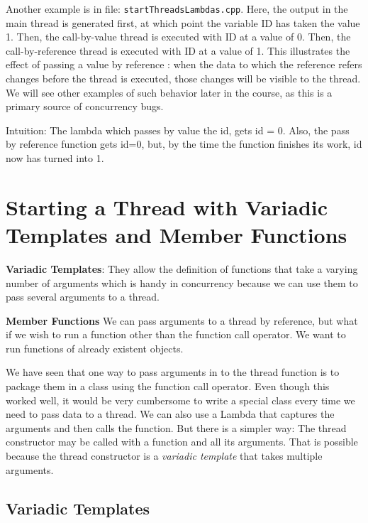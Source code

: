\documentclass[11pt, a4paper]{article}
\begin{document}
Another example is in file: \texttt{startThreadsLambdas.cpp}. Here, the output in the main thread is generated first, at which point the variable ID has taken the value 1. Then, the call-by-value thread is executed with ID at a value of 0. Then, the call-by-reference thread is executed with ID at a value of 1. This illustrates the effect of passing a value by reference : when the data to which the reference refers changes before the thread is executed, those changes will be visible to the thread. We will see other examples of such behavior later in the course, as this is a primary source of concurrency bugs.


Intuition: The lambda which passes by value the id, gets id = 0. Also, the pass by reference function gets id=0, but, by the time the function finishes its work, id now has turned into 1.






\section{Starting a Thread with Variadic Templates and Member Functions}%
\label{sec:starting_a_thread_with_variadic_templates_and_member_functions}


\textbf{Variadic Templates}: They allow the definition of functions that take a varying number of arguments which is handy in concurrency because we can use them to pass several arguments to a thread. 

\textbf{Member Functions} We can pass arguments to a thread by reference, but what if we wish to run a function other than the function call operator. We want to run functions of already existent objects. 



We have seen that one way to pass arguments in to the thread function is to package them in a class using the function call operator. Even though this worked well, it would be very cumbersome to write a special class every time we need to pass data to a thread. We can also use a Lambda that captures the arguments and then calls the function. But there is a simpler way: The thread constructor may be called with a function and all its arguments. That is possible because the thread constructor is a \textit{variadic template} that takes multiple arguments.


\subsection{Variadic Templates}%
\label{sub:variadic_templates}
\end{document}
